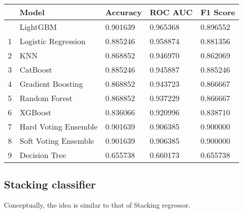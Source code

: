 \documentclass[
  letterpaper,
  DIV=11,
  numbers=noendperiod]{scrreprt}
\begin{document}
\begin{longtable}[]{@{}lllll@{}}
\toprule\noalign{}
& Model & Accuracy & ROC AUC & F1 Score \\
\midrule\noalign{}
\endhead
\bottomrule\noalign{}
\endlastfoot
0 & LightGBM & 0.901639 & 0.965368 & 0.896552 \\
1 & Logistic Regression & 0.885246 & 0.958874 & 0.881356 \\
2 & KNN & 0.868852 & 0.946970 & 0.862069 \\
3 & CatBoost & 0.885246 & 0.945887 & 0.885246 \\
4 & Gradient Boosting & 0.868852 & 0.943723 & 0.866667 \\
5 & Random Forest & 0.868852 & 0.937229 & 0.866667 \\
6 & XGBoost & 0.836066 & 0.920996 & 0.838710 \\
7 & Hard Voting Ensemble & 0.901639 & 0.906385 & 0.900000 \\
8 & Soft Voting Ensemble & 0.901639 & 0.906385 & 0.900000 \\
9 & Decision Tree & 0.655738 & 0.660173 & 0.655738 \\
\end{longtable}

\subsection{Stacking classifier}\label{stacking-classifier}

Conceptually, the idea is similar to that of Stacking regressor.
\end{document}
